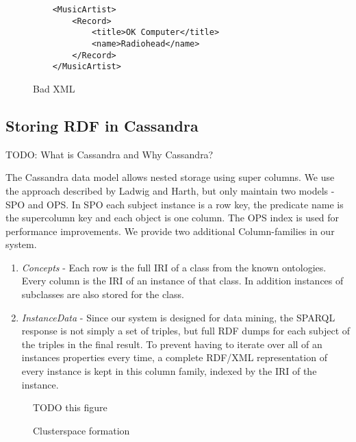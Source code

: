\documentclass[conference]{IEEEtran}
\begin{document}
\begin{figure}
    \caption{Bad XML}
    \label{ex:xml-bad}
    \begin{verbatim}
    <MusicArtist>
        <Record>
            <title>OK Computer</title>
            <name>Radiohead</name>
        </Record>
    </MusicArtist>
    \end{verbatim}
\end{figure}

\subsection{Storing RDF in Cassandra}

TODO: What is Cassandra and Why Cassandra?

The Cassandra data model allows nested storage using super columns. We use the
approach described by Ladwig and Harth\cite{ladwig:11}, but only maintain two
models - SPO and OPS. In SPO each subject instance is a row key, the predicate
name is the supercolumn key and each object is one column. The OPS index is
used for performance improvements. We provide two additional Column-families in
our system.

\begin{enumerate}
    \item \emph{Concepts} - Each row is the full IRI of a class from the known
        ontologies. Every column is the IRI of an instance of that class. In
        addition instances of subclasses are also stored for the class.

    \item \emph{InstanceData} - Since our system is designed for data mining,
        the SPARQL response is not simply a set of triples, but full RDF dumps
        for each subject of the triples in the final result. To prevent having
        to iterate over all of an instances properties every time, a complete
        RDF/XML representation of every instance is kept in this column family,
        indexed by the IRI of the instance.

\end{enumerate}

\begin{figure}
    \caption{Clusterspace formation}
    \label{cs-algo}
    TODO this figure
\end{figure}
\end{document}
